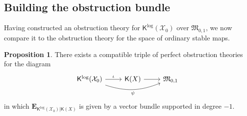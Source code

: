 \documentclass[11pt]{amsart}
\theoremstyle{definition}
\theoremstyle{definition}
\newtheorem{proposition}[theorem]{Proposition}
\newcommand{\EE}{\mathbf{E}}
\newcommand{\Xcal}{\mathcal{X}}
\newcommand{\Mfrak}{\mathfrak{M}}
\newcommand{\Kup}{\mathsf{K}}
\begin{document}
\subsection{Building the obstruction bundle} Having constructed an obstruction theory for $\Kup^{\log}(\Xcal_0)$ over $\Mfrak_{0,1}$, we now compare it to the obstruction theory for the space of ordinary stable maps.
\begin{proposition}\label{prop: pushforward compatible triple} There exists a compatible triple of perfect obstruction theories for the diagram
\begin{equation} \label{diag: final triangle of spaces}
\begin{tikzcd}
\Kup^{\log}(\Xcal_0) \ar[r,"\iota"] \ar[rr,bend right=20pt,"\psi" below] & \Kup(X) \ar[r] & \Mfrak_{0,1}
\end{tikzcd}
\end{equation}
in which $\EE_{\Kup^{\log}(\Xcal_0)|\Kup(X)}$ is given by a vector bundle supported in degree $-1$.\end{proposition}
\end{document}
